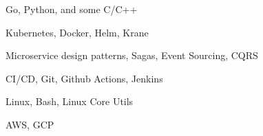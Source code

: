 \item Go, Python, and some C/C++
\item Kubernetes, Docker, Helm, Krane
\item Microservice design patterns, Sagas, Event Sourcing, CQRS
\item CI/CD, Git, Github Actions, Jenkins
\item Linux, Bash, Linux Core Utils
\item AWS, GCP
